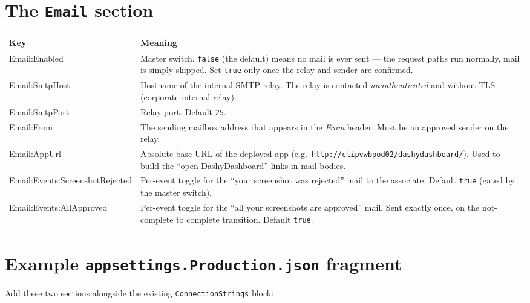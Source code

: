 \documentclass[12pt,a4paper]{report}
\begin{document}
\section{The \texttt{Email} section}

\begin{longtable}{>{\ttfamily\small}p{6.0cm} >{\raggedright\arraybackslash}p{8.0cm}}
\toprule
\normalfont\textbf{Key} & \textbf{Meaning} \\
\midrule
\endhead
Email:Enabled &
  Master switch. \texttt{false} (the default) means no mail is ever sent --- the request paths run
  normally, mail is simply skipped. Set \texttt{true} only once the relay and sender are confirmed. \\
Email:SmtpHost &
  Hostname of the internal SMTP relay. The relay is contacted \emph{unauthenticated} and without TLS
  (corporate internal relay). \\
Email:SmtpPort &
  Relay port. Default \texttt{25}. \\
Email:From &
  The sending mailbox address that appears in the \emph{From} header. Must be an approved sender on
  the relay. \\
Email:AppUrl &
  Absolute base URL of the deployed app (e.g.\
  \texttt{http://clipvwbpod02/dashydashboard/}). Used to build the ``open DashyDashboard'' links in
  mail bodies. \\
Email:Events:ScreenshotRejected &
  Per-event toggle for the ``your screenshot was rejected'' mail to the associate. Default
  \texttt{true} (gated by the master switch). \\
Email:Events:AllApproved &
  Per-event toggle for the ``all your screenshots are approved'' mail. Sent exactly once, on the
  not-complete to complete transition. Default \texttt{true}. \\
\bottomrule
\end{longtable}

\section{Example \texttt{appsettings.Production.json} fragment}

Add these two sections alongside the existing \texttt{ConnectionStrings} block:
\end{document}
